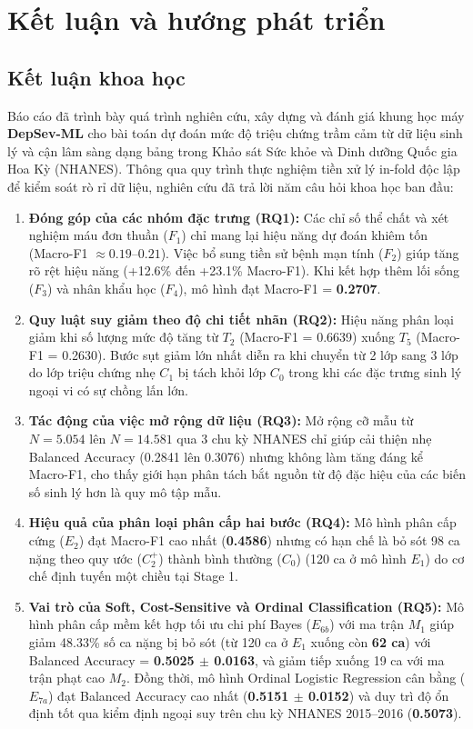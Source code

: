 \chapter{Kết luận và hướng phát triển}
\label{ch:ket-luan}

\section{Kết luận khoa học}
\label{sec:ket-luan-khoa-hoc}

Báo cáo đã trình bày quá trình nghiên cứu, xây dựng và đánh giá khung học máy \textbf{DepSev-ML} cho bài toán dự đoán mức độ triệu chứng trầm cảm từ dữ liệu sinh lý và cận lâm sàng dạng bảng trong Khảo sát Sức khỏe và Dinh dưỡng Quốc gia Hoa Kỳ (NHANES). Thông qua quy trình thực nghiệm tiền xử lý in-fold độc lập để kiểm soát rò rỉ dữ liệu, nghiên cứu đã trả lời năm câu hỏi khoa học ban đầu:

\begin{enumerate}
    \item \textbf{Đóng góp của các nhóm đặc trưng (RQ1):} Các chỉ số thể chất và xét nghiệm máu đơn thuần ($F_1$) chỉ mang lại hiệu năng dự đoán khiêm tốn (Macro-F1 $\approx 0.19$--$0.21$). Việc bổ sung tiền sử bệnh mạn tính ($F_2$) giúp tăng rõ rệt hiệu năng (+12.6\% đến +23.1\% Macro-F1). Khi kết hợp thêm lối sống ($F_3$) và nhân khẩu học ($F_4$), mô hình đạt Macro-F1 = \textbf{0.2707}.
    \item \textbf{Quy luật suy giảm theo độ chi tiết nhãn (RQ2):} Hiệu năng phân loại giảm khi số lượng mức độ tăng từ $T_2$ (Macro-F1 = 0.6639) xuống $T_5$ (Macro-F1 = 0.2630). Bước sụt giảm lớn nhất diễn ra khi chuyển từ 2 lớp sang 3 lớp do lớp triệu chứng nhẹ $C_1$ bị tách khỏi lớp $C_0$ trong khi các đặc trưng sinh lý ngoại vi có sự chồng lấn lớn.
    \item \textbf{Tác động của việc mở rộng dữ liệu (RQ3):} Mở rộng cỡ mẫu từ $N = 5.054$ lên $N = 14.581$ qua 3 chu kỳ NHANES chỉ giúp cải thiện nhẹ Balanced Accuracy (0.2841 lên 0.3076) nhưng không làm tăng đáng kể Macro-F1, cho thấy giới hạn phân tách bắt nguồn từ độ đặc hiệu của các biến số sinh lý hơn là quy mô tập mẫu.
    \item \textbf{Hiệu quả của phân loại phân cấp hai bước (RQ4):} Mô hình phân cấp cứng ($E_2$) đạt Macro-F1 cao nhất (\textbf{0.4586}) nhưng có hạn chế là bỏ sót 98 ca nặng theo quy ước ($C_2^+$) thành bình thường ($C_0$) (120 ca ở mô hình $E_1$) do cơ chế định tuyến một chiều tại Stage 1.
    \item \textbf{Vai trò của Soft, Cost-Sensitive và Ordinal Classification (RQ5):} Mô hình phân cấp mềm kết hợp tối ưu chi phí Bayes ($E_{6b}$) với ma trận $M_1$ giúp giảm 48.33\% số ca nặng bị bỏ sót (từ 120 ca ở $E_1$ xuống còn \textbf{62 ca}) với Balanced Accuracy = \textbf{0.5025 $\pm$ 0.0163}, và giảm tiếp xuống 19 ca với ma trận phạt cao $M_2$. Đồng thời, mô hình Ordinal Logistic Regression cân bằng ($E_{7a}$) đạt Balanced Accuracy cao nhất (\textbf{0.5151 $\pm$ 0.0152}) và duy trì độ ổn định tốt qua kiểm định ngoại suy trên chu kỳ NHANES 2015--2016 (\textbf{0.5073}).
\end{enumerate}

